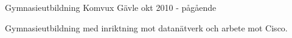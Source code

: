 

\begin{cventries}

  \cventry
    {Gymnasieutbildning} %
    {Komvux} %
    {Gävle} %
    {okt 2010 - pågående} %
    {
      \begin{cvitems} %
        \item {Gymnasieutbildning med inriktning mot datanätverk och arbete mot Cisco.}
      \end{cvitems}
    }

\end{cventries}
